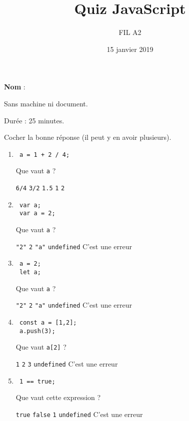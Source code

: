 \documentclass[a4paper, 12pt]{article}
\title{Quiz JavaScript}
\author{FIL A2}
\date{15 janvier 2019}
\newcommand{\choice}[1]{\Square\hspace{2pt} #1\hspace{5pt}}
\newcommand{\choicec}[1]{\Square\hspace{2pt} \lstinline{#1}\hspace{5pt}}
\newcommand{\fullpoint}[1]{\textcolor{RubineRed}{#1}}
\newcommand{\choiceg}[1]{\fullpoint{\XBox\hspace{2pt} #1\hspace{5pt}}}
\newcommand{\choicecg}[1]{\fullpoint{\XBox\hspace{2pt} \lstinline{#1}\hspace{5pt}}}
\begin{document}
\maketitle

\textbf{Nom} :

Sans machine ni document.

Durée : 25 minutes.

Cocher la bonne réponse (il peut y en avoir plusieurs).

\begin{enumerate}
\item \lstset{language=javascript}
\begin{lstlisting}
 a = 1 + 2 / 4;
\end{lstlisting}

  Que vaut \lstinline{a} ?

  \choicec{6/4} \choicec{3/2} \choicecg{1.5} \choicec{1} \choicec{2}

\item \lstset{language=javascript}
\begin{lstlisting}
 var a;
 var a = 2;
\end{lstlisting}

  Que vaut \lstinline{a} ?

  \choicec{"2"} \choicecg{2} \choicec{"a"} \choicec{undefined} \choice{C'est une erreur}
\item \lstset{language=javascript}
\begin{lstlisting}
 a = 2;
 let a;
\end{lstlisting}

  Que vaut \lstinline{a} ?

  \choicec{"2"} \choicec{2} \choicec{"a"} \choicec{undefined} \choiceg{C'est une erreur}
\item \lstset{language=javascript}
\begin{lstlisting}
 const a = [1,2];
 a.push(3);
\end{lstlisting}

  Que vaut \lstinline{a[2]} ?

  \choicec{1} \choicec{2} \choicecg{3} \choicec{undefined} \choice{C'est une erreur}
\item \lstset{language=javascript}
\begin{lstlisting}
 1 == true;
\end{lstlisting}

  Que vaut cette expression ?

  \choicecg{true} \choicec{false} \choicec{1} \choicec{undefined} \choice{C'est une erreur}


\end{enumerate}
\end{document}
